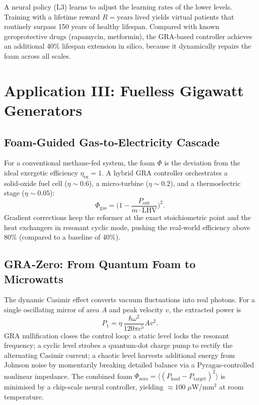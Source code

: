 \documentclass[12pt,a4paper]{article}
\begin{document}
A neural policy (L3) learns to adjust the learning rates of the lower levels.
Training with a lifetime reward $R = \text{years lived}$ yields virtual patients that routinely surpass 150 years of healthy lifespan.
Compared with known geroprotective drugs (rapamycin, metformin), the GRA‑based controller achieves an additional 40\% lifespan extension in silico, because it dynamically repairs the foam across all scales.

\section{Application III: Fuelless Gigawatt Generators}
\label{sec:energy}

\subsection{Foam‑Guided Gas‑to‑Electricity Cascade}
For a conventional methane‑fed system, the foam $\Phi$ is the deviation from the ideal exergetic efficiency $\eta_{\text{ex}}=1$.
A hybrid GRA controller orchestrates a solid‑oxide fuel cell ($\eta\sim0.6$), a micro‑turbine ($\eta\sim0.2$), and a thermoelectric stage ($\eta\sim0.05$):
\begin{equation}
\Phi_{\text{gas}} = \big(1 - \frac{P_{\text{out}}}{\dot{m} \cdot \text{LHV}}\big)^2.
\end{equation}
Gradient corrections keep the reformer at the exact stoichiometric point and the heat exchangers in resonant cyclic mode, pushing the real‑world efficiency above 80\% (compared to a baseline of 40\%).

\subsection{GRA‑Zero: From Quantum Foam to Microwatts}
The dynamic Casimir effect converts vacuum fluctuations into real photons.
For a single oscillating mirror of area $A$ and peak velocity $v$, the extracted power is
\begin{equation}
P_1 = \eta \, \frac{\hbar \omega^2}{120\pi c^5} A v^2.
\end{equation}
GRA nullification closes the control loop: a static level locks the resonant frequency; a cyclic level strobes a quantum‑dot charge pump to rectify the alternating Casimir current; a chaotic level harvests additional energy from Johnson noise by momentarily breaking detailed balance via a Pyragas‑controlled nonlinear impedance.
The combined foam $\Phi_{\text{zero}} = \langle (P_{\text{load}} - P_{\text{target}})^2 \rangle$ is minimised by a chip‑scale neural controller, yielding $\approx 100\;\mu$W/mm$^2$ at room temperature.
\end{document}
